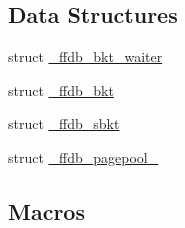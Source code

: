 \subsection*{Data Structures}
\begin{DoxyCompactItemize}
\item 
struct \mbox{\hyperlink{struct__ffdb__bkt__waiter}{\+\_\+ffdb\+\_\+bkt\+\_\+waiter}}
\item 
struct \mbox{\hyperlink{struct__ffdb__bkt}{\+\_\+ffdb\+\_\+bkt}}
\item 
struct \mbox{\hyperlink{struct__ffdb__sbkt}{\+\_\+ffdb\+\_\+sbkt}}
\item 
struct \mbox{\hyperlink{struct__ffdb__pagepool__}{\+\_\+ffdb\+\_\+pagepool\+\_\+}}
\end{DoxyCompactItemize}
\subsection*{Macros}
